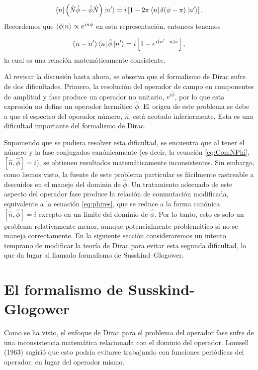         \begin{equation}
            \bra{n} \left( \hat{N}\hat{\phi} - \hat{\phi}\hat{N} \right) \ket{n'} = i \left[ 1 - 2\pi \bra{n}\delta(\phi-\pi) \ket{n'} \right].
        \end{equation}
        Recordemos que $\braket{\phi|n}\propto e^{in\phi}$ en esta representación, entonces tenemos

        \begin{equation}
            (n-n')\bra{n}\hat{\phi}\ket{n'} = i \left[ 1 - e^{i(n'-n)\pi} \right],
        \end{equation}
        la cual es una relación matemáticamente consistente.

        Al revisar la discusión hasta ahora, se observa que el formalismo de Dirac sufre de dos dificultades. Primero, la resolución del operador de campo en componentes de amplitud y fase produce un operador no unitario, $e^{i\hat{\phi}}$, por lo que esta expresión no define un operador hermítico $\hat{\phi}$. El origen de este problema se debe a que el espectro del operador número, $\hat{n}$, está acotado inferiormente. Esta es una dificultad importante del formalismo de Dirac.

        Suponiendo que se pudiera resolver esta dificultad, se encuentra que al tener el número y la fase conjugados canónicamente (es decir, la ecuación \ref{eq:ComNPhi}, $[\hat{n},\hat{\phi}]=i$), se obtienen resultados matemáticamente inconsistentes. Sin embargo, como hemos visto, la fuente de este problema particular es fácilmente rastreable a descuidos en el manejo del dominio de $\hat{\phi}$. Un tratamiento adecuado de este aspecto del operador fase produce la relación de conmutación modificada,  equivalente a la ecuación \ref{eq:phires}, que se reduce a la forma canónica $[\hat{n},\hat{\phi}]=i$ excepto en un límite del dominio de $\hat{\phi}$. Por lo tanto, esto es solo un problema relativamente menor, aunque potencialmente problemático si no se maneja correctamente. En la siguiente sección consideraremos un intento temprano de modificar la teoría de Dirac para evitar esta segunda dificultad, lo que da lugar al llamado formalismo de Susskind–Glogower.

\section{El formalismo de Susskind-Glogower}

	    Como se ha visto, el enfoque de Dirac para el problema del operador fase sufre de una inconsistencia matemática relacionada con el dominio del operador. Louisell (1963) sugirió que esto podría evitarse trabajando con funciones periódicas del operador, en lugar del operador mismo.
	
